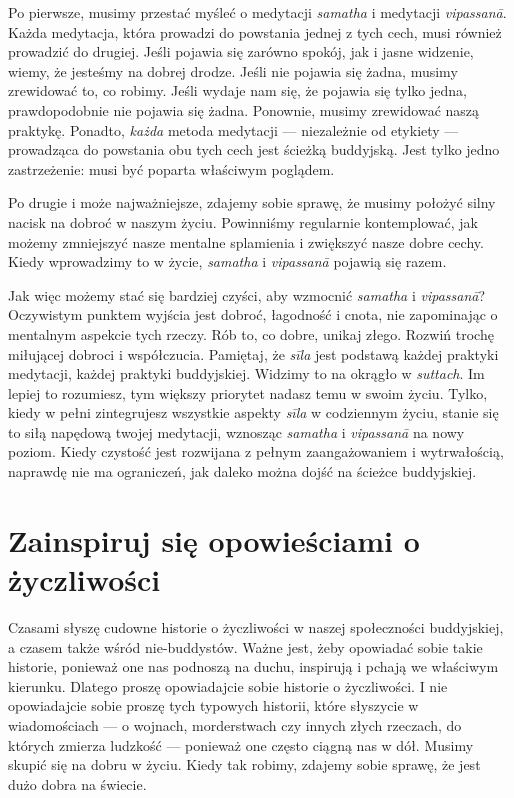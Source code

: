 \documentclass[12pt,openany]{book}
\begin{document}
Po pierwsze, musimy przestać myśleć o medytacji \textit{samatha} i medytacji \textit{vipassanā}. Każda medytacja, która prowadzi do powstania jednej z tych cech, musi również prowadzić do drugiej. Jeśli pojawia się zarówno spokój, jak i jasne widzenie, wiemy, że jesteśmy na dobrej drodze. Jeśli nie pojawia się żadna, musimy zrewidować to, co robimy. Jeśli wydaje nam się, że pojawia się tylko jedna, prawdopodobnie nie pojawia się żadna. Ponownie, musimy zrewidować naszą praktykę. Ponadto, \textit{każda} metoda medytacji --- niezależnie od etykiety --- prowadząca do powstania obu tych cech jest ścieżką buddyjską. Jest tylko jedno zastrzeżenie: musi być poparta właściwym poglądem.

Po drugie i może najważniejsze, zdajemy sobie sprawę, że musimy położyć silny nacisk na dobroć w naszym życiu. Powinniśmy regularnie kontemplować, jak możemy zmniejszyć nasze men\-tal\-ne splamienia i zwiększyć nasze dobre cechy. Kiedy wprowadzimy to w życie, \textit{samatha} i \textit{vipassanā} pojawią się razem.

Jak więc możemy stać się bardziej czyści, aby wzmocnić \textit{samatha} i \textit{vipassanā}? Oczywistym punktem wyjścia jest dobroć, łagodność i cnota, nie zapominając o mentalnym aspekcie tych rzeczy. Rób to, co dobre, unikaj złego. Rozwiń trochę miłującej dobroci i współczucia. Pamiętaj, że \textit{sīla} jest podstawą każdej praktyki medytacji, każdej praktyki buddyjskiej. Widzimy to na okrągło w \textit{suttach}. Im lepiej to rozumiesz, tym większy priorytet nadasz temu w swoim życiu. Tylko, kiedy w pełni zintegrujesz wszystkie aspek\-ty \textit{sīla} w codziennym życiu, stanie się to siłą napędową twojej medytacji, wznosząc \textit{samatha} i \textit{vipassanā} na nowy poziom. Kiedy czystość jest rozwijana z pełnym zaangażowaniem i wytrwałością, naprawdę nie ma ograniczeń, jak daleko można dojść na ścieżce buddyjskiej.

\section*{Zainspiruj się opowieściami o życzliwości}

Czasami słyszę cudowne historie o życzliwości w naszej społeczności buddyjskiej, a czasem także wśród nie-buddystów. Ważne jest, żeby opowiadać sobie takie historie, ponieważ one nas podnoszą na duchu, inspirują i pchają we właściwym kierunku. Dlatego proszę opowiadajcie sobie historie o życzliwości. I nie opowiadajcie sobie proszę tych typowych historii, które słyszycie w wiadomościach --- o wojnach, morderstwach czy innych złych rzeczach, do których zmierza ludzkość --- ponieważ one często ciągną nas w dół. Musimy skupić się na dobru w życiu. Kiedy tak robimy, zdajemy sobie sprawę, że jest dużo dobra na świecie.
\end{document}
